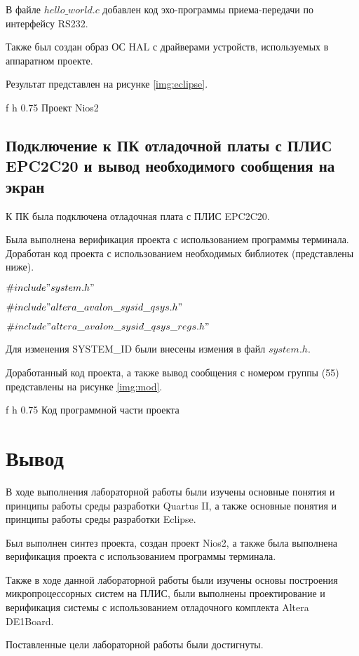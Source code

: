 В файле  $hello\_world.c$ добавлен код эхо-программы приема-передачи по интерфейсу RS232.

Также был создан образ ОС HAL с драйверами устройств, используемых в аппаратном проекте.

Результат представлен на рисунке \ref{img:eclipse}.

{f} %
{h} %
{0.75\textwidth}
{Проект Nios2}
\clearpage

\section*{Подключение к ПК отладочной платы с ПЛИС EPC2C20 и вывод необходимого сообщения на экран}
К ПК была подключена отладочная плата с ПЛИС EPC2C20.

Была выполнена верификация проекта с использованием программы терминала. Доработан код проекта с использованием необходимых библиотек (представлены ниже).

$\#include "system.h"$

$\#include "altera\_avalon\_sysid\_qsys.h"$

$\#include "altera\_avalon\_sysid\_qsys\_regs.h"$

Для изменения SYSTEM\_ID были внесены измения в файл $system.h$.

Доработанный код проекта, а также вывод сообщения с номером группы (55) представлены на рисунке \ref{img:mod}.

{f} %
{h} %
{0.75\textwidth}
{Код программной части проекта}
\clearpage

\chapter{Вывод}

В ходе выполнения лабораторной работы были изучены основные понятия и принципы работы среды разработки Quartus II, а также основные понятия и принципы работы среды разработки Eclipse.

Был выполнен синтез проекта, создан проект Nios2, а также была выполнена верификация проекта с использованием программы терминала.

Также в ходе данной лабораторной работы были изучены основы построения микропроцессорных систем на ПЛИС, были выполнены проектирование и верификация системы с использованием отладочного комплекта  Altera DE1Board.

Поставленные цели лабораторной работы были достигнуты.
